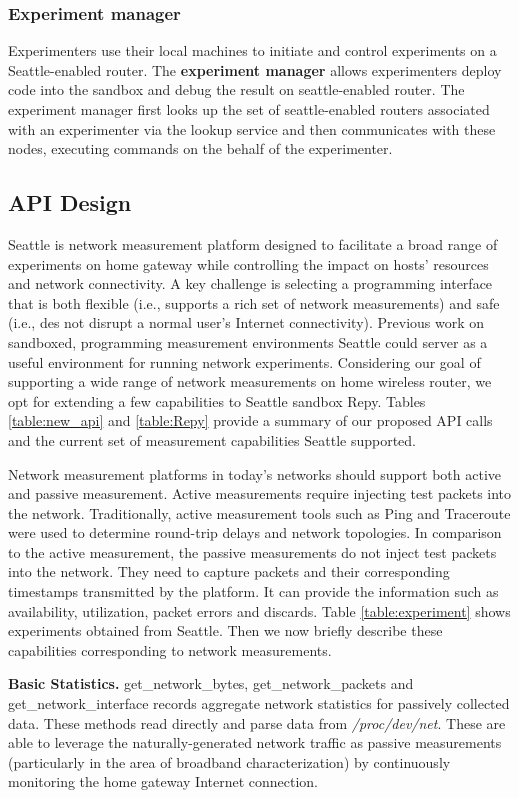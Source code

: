 \subsubsection{Experiment manager}
Experimenters use their local machines to initiate and control experiments on a Seattle-enabled router. The \textbf{experiment manager} allows experimenters deploy code into the sandbox and debug the result on seattle-enabled router. The experiment manager first looks up the set of seattle-enabled routers associated with an experimenter via the lookup service and then communicates with these nodes, executing commands on the behalf of the experimenter. 

\subsection{API Design}
Seattle is network measurement platform designed to facilitate a broad range of experiments on home gateway while controlling the impact on hosts' resources and network connectivity. A key challenge is selecting a programming interface that is both flexible (i.e., supports a rich set of network measurements) and safe (i.e., des not disrupt a normal user's Internet connectivity). Previous work on sandboxed, programming measurement environments Seattle could server as a useful environment for running network experiments. Considering our goal of supporting a wide range of network measurements on home wireless router, we opt for extending a few capabilities to Seattle sandbox Repy. Tables \ref{table:new_api} and \ref{table:Repy} provide a summary of our proposed API calls and the current set of measurement capabilities Seattle supported. 

Network measurement platforms in today's networks should support both active and passive measurement. Active measurements require injecting test packets into the network. Traditionally, active measurement tools such as Ping and Traceroute were used to determine round-trip delays and network topologies. In comparison to the active measurement, the passive measurements do not inject test packets into the network. They need to capture packets and their corresponding timestamps transmitted by the platform. It can provide the information such as availability, utilization, packet errors and discards. Table \ref{table:experiment} shows experiments obtained from Seattle. Then we now briefly describe these capabilities corresponding to network measurements.

\textbf{Basic Statistics.} get\_network\_bytes, get\_network\_packets and get\_network\_interface records aggregate network statistics for passively collected data. These methods read directly and parse data from \emph{/proc/dev/net}. These are able to leverage the naturally-generated network traffic as passive measurements (particularly in the area of broadband characterization) by continuously monitoring the home gateway Internet connection.

